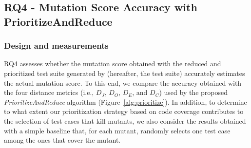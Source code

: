 %

%
%
%


\subsection{RQ4 - Mutation Score Accuracy with PrioritizeAndReduce}
\label{exp:accuracy:prioritize}

\subsubsection*{Design and measurements}


RQ4 assesses whether the mutation score obtained with the reduced and prioritized test suite generated by \APPR (hereafter, the \APPR test suite) accurately estimates the actual mutation  score.
To this end, we compare the accuracy obtained with the four distance metrics (i.e., $D_J$, $D_O$, $D_E$, and $D_C$) used by the proposed \emph{PrioritizeAndReduce} algorithm (Figure~\ref{alg:prioritize}). In addition, to determine to what extent our prioritization strategy based on code coverage contributes to the selection of test cases that kill mutants, we also consider the results obtained with a simple baseline that, for each mutant, randomly selects one test case among the ones that cover the mutant. 


